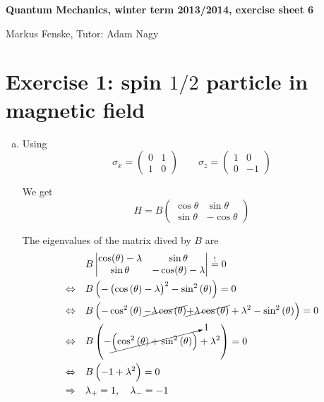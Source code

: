\documentclass[a4paper,german,12pt,smallheadings]{scrartcl}
\begin{document}
\allowdisplaybreaks %
\begin{center}
\bfseries %
\sffamily %
\vspace{-40pt}
Quantum Mechanics, winter term 2013/2014, exercise sheet 6

Markus Fenske, Tutor: Adam Nagy
\vspace{-10pt}
\end{center}

\section*{Exercise 1: spin $1/2$ particle in magnetic field}
\begin{enumerate}[a)]
  \item
    Using
    \begin{equation*}
    \sigma_x = \begin{pmatrix}0 & 1 \\ 1 & 0\end{pmatrix} \qquad \sigma_z = \begin{pmatrix}1 & 0 \\ 0 & -1\end{pmatrix}
    \end{equation*}

    We get
    \begin{equation*}
    H = B \begin{pmatrix} \cos \theta & \sin \theta \\ \sin \theta & -\cos \theta \end{pmatrix}
    \end{equation*}

    The eigenvalues of the matrix dived by $B$ are
    \begin{align*}
    &B \begin{vmatrix} \cos(\theta) - \lambda & \sin \theta \\ \sin \theta & -\cos(\theta) - \lambda \end{vmatrix} \overset{!}{=} 0 \\
      \Leftrightarrow\quad&B \del{-\del{\cos\del{\theta} - \lambda}^2-\sin^2\del{\theta}}  = 0\\
      \Leftrightarrow\quad&B \del{-\cos^2\del\theta \cancel{-\lambda\cos\del\theta}\cancel{+\lambda\cos\del\theta}+\lambda^2-\sin^2\del\theta} = 0\\
      \Leftrightarrow\quad&B \del{-\cancelto{1}{\del{\cos^2\del\theta+\sin^2\del\theta}}+\lambda^2} = 0\\
      \Leftrightarrow\quad&B \del{-1+\lambda^2} = 0\\
      \Rightarrow\quad &\lambda_+ = 1,\quad \lambda_- = -1
    \end{align*}


\end{enumerate}
\end{document}
